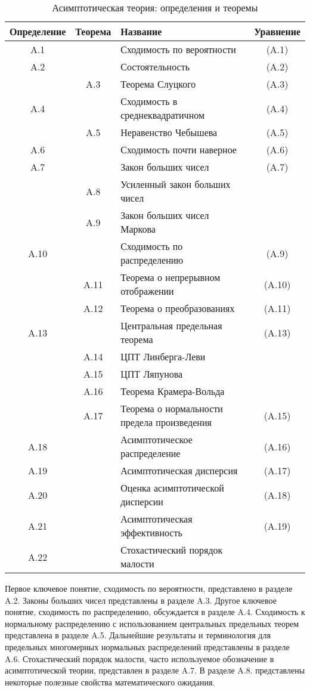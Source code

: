 \begin{table}[h]
\caption{\label{tab:pred} Асимптотическая теория: определения и теоремы}
\begin{tabular}{cclc}
\hline 
\hline
Определение & Теорема & Название & Уравнение \\ 
\hline 
A.1 &  & Сходимость по вероятности & (A.1) \\ 
A.2 &   & Состоятельность & (A.2) \\ 
 & A.3 & Теорема Слуцкого & (A.3) \\ 
A.4 &  & Сходимость в среднеквадратичном & (A.4) \\ 
 & A.5 & Неравенство Чебышева & (A.5) \\ 
A.6 &  & Сходимость почти наверное & (A.6) \\ 
A.7 &  & Закон больших чисел & (A.7) \\ 
 & A.8 & Усиленный закон больших чисел &  \\ 
 & A.9 & Закон больших чисел Маркова &  \\ 
A.10 &  & Сходимость по распределению & (A.9) \\ 
 & A.11 & Теорема о непрерывном отображении & (A.10) \\ 
  & A.12 & Теорема о преобразованиях &  (A.11) \\ 
A.13 &  & Центральная предельная теорема & (A.13)  \\ 
 & A.14 & ЦПТ Линберга-Леви & \\
 & A.15 & ЦПТ Ляпунова & \\
 & A.16 & Теорема Крамера-Вольда & \\
 & A.17 & Теорема о нормальности предела произведения & (A.15) \\
A.18 & & Асимптотическое распределение & (A.16) \\
A.19 & & Асимптотическая дисперсия & (A.17) \\
A.20 & & Оценка асимптотической дисперсии & (A.18) \\
A.21 & & Асимптотическая эффективность & (A.19) \\
A.22 & & Стохастический порядок малости & \\
\hline
\hline
\end{tabular} 
\end{table}

Первое ключевое понятие, сходимость по вероятности, представлено в разделе A.2. Законы больших чисел представлены в разделе A.3. Другое ключевое понятие, сходимость по распределению, обсуждается в разделе A.4. Сходимость к нормальному распределению с использованием центральных предельных теорем представлена в разделе A.5. Дальнейшие результаты и терминология для предельных многомерных нормальных распределений представлены в разделе A.6. Стохастический порядок малости, часто используемое обозначение в асимптотической теории, представлен в разделе A.7. В разделе A.8. представлены некоторые полезные свойства математического ожидания.


